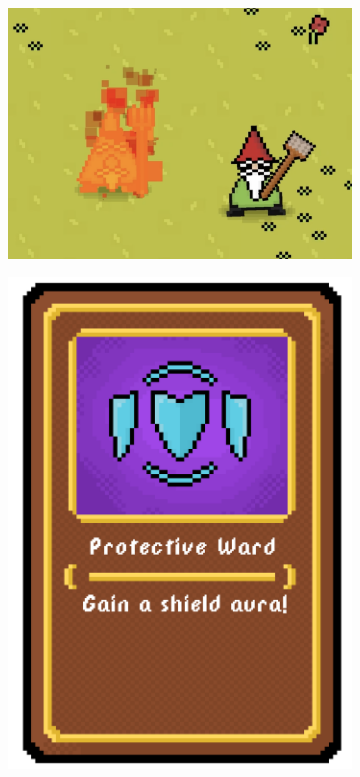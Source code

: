 \documentclass[a4paper,10pt,english]{article}
\begin{document}
\begin{figure}[h]

\centering

\begin{subfigure}{0.29\linewidth}
\includegraphics[width=\linewidth]{gnomes.png}
\label{Fig:Style1A}
\end{subfigure}\hfill
%
\begin{subfigure}{0.29\linewidth}
\includegraphics[width=\linewidth]{card.png}

\end{subfigure}
\end{figure}
\end{document}
